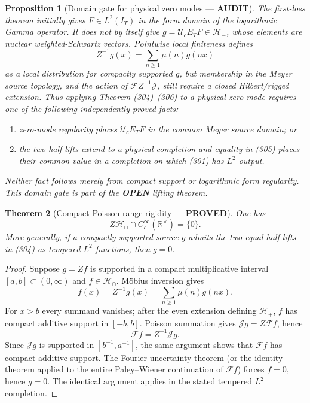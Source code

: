 \documentclass[11pt]{article}
\newtheorem{theorem}{Theorem}
\newtheorem{proposition}[theorem]{Proposition}
\newcommand{\PROVED}{\textcolor{green!45!black}{\textbf{PROVED}}}
\newcommand{\OPEN}{\textcolor{red!70!black}{\textbf{OPEN}}}
\newcommand{\AUDIT}{\textcolor{orange!75!black}{\textbf{AUDIT}}}
\begin{document}
\begin{proposition}[Domain gate for physical zero modes --- \AUDIT]
The first-loss theorem initially gives $F\in L^2(I_T)$ in the form domain of
the logarithmic Gamma operator.  It does not by itself give
$g=\mathcal U_cE_TF\in\mathcal H_-$, whose elements are nuclear
weighted-Schwartz vectors.  Pointwise local finiteness defines
\begin{equation}
 Z^{-1}g(x)=\sum_{n\ge1}\mu(n)g(nx)                   \tag{306a}
\end{equation}
as a local distribution for compactly supported $g$, but membership in the
Meyer source topology, and the action of
$\mathcal FZ^{-1}\mathscr J$, still require a closed Hilbert/rigged
extension.  Thus applying Theorem (304)--(306) to a physical zero mode
requires one of the following independently proved facts:
\begin{enumerate}
\item zero-mode regularity places $\mathcal U_cE_TF$ in the common Meyer
      source domain; or
\item the two half-lifts extend to a physical completion and equality in
      (305) places their common value in a completion on which (301) has
      $L^2$ output.
\end{enumerate}
Neither fact follows merely from compact support or logarithmic form
regularity.  This domain gate is part of the \OPEN{} lifting theorem.
\end{proposition}

\begin{theorem}[Compact Poisson-range rigidity --- \PROVED]
One has
\begin{equation}
 Z\mathcal H_\cap\cap C_c^\infty(\mathbb R_+^\times)=\{0\}.    \tag{306b}
\end{equation}
More generally, if a compactly supported source $g$ admits the two equal
half-lifts in (304) as tempered $L^2$ functions, then $g=0$.
\end{theorem}

\begin{proof}
Suppose $g=Zf$ is supported in a compact multiplicative interval
$[a,b]\subset(0,\infty)$ and $f\in\mathcal H_\cap$.  Möbius inversion gives
\[
 f(x)=Z^{-1}g(x)=\sum_{n\ge1}\mu(n)g(nx).
\]
For $x>b$ every summand vanishes; after the even extension defining
$\mathcal H_+$, $f$ has compact additive support in $[-b,b]$.  Poisson
summation gives $\mathscr Jg=Z\mathcal Ff$, hence
\[
 \mathcal Ff=Z^{-1}\mathscr Jg.
\]
Since $\mathscr Jg$ is supported in $[b^{-1},a^{-1}]$, the same argument
shows that $\mathcal Ff$ has compact additive support.  The Fourier
uncertainty theorem (or the identity theorem applied to the entire
Paley--Wiener continuation of $\mathcal Ff$) forces $f=0$, hence $g=0$.
The identical argument applies in the stated tempered $L^2$ completion.
\end{proof}
\end{document}
